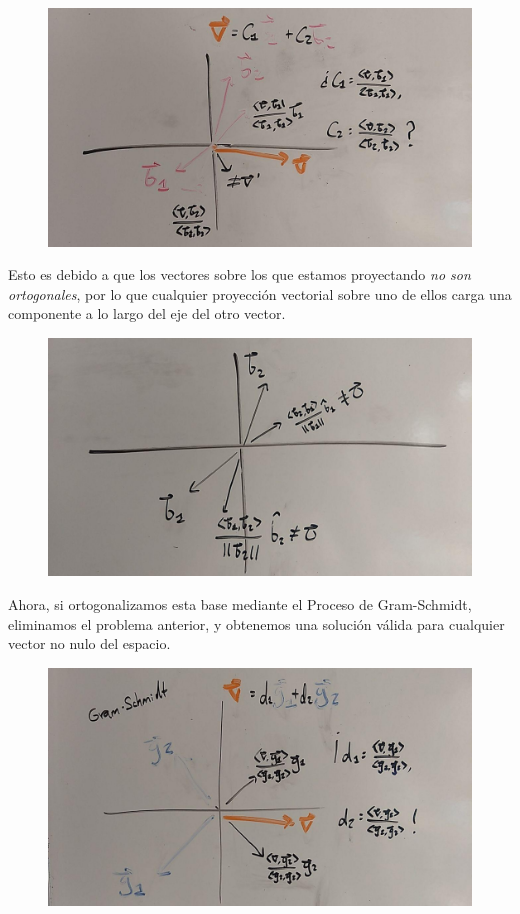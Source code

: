 \documentclass[12pt,dvipsnames]{article}
\numberwithin{equation}{section}
\begin{document}
\begin{figure}[h!]
    \centering
    \includegraphics[width=16cm]{3/Bases_ortogonales_y_ortonormales_3-2.jpg}
\end{figure}

Esto es debido a que los vectores sobre los que estamos proyectando \emph{no son ortogonales}, por lo que cualquier proyección vectorial sobre uno de ellos carga una componente a lo largo del eje del otro vector. 

\begin{figure}[h!]
    \centering
    \includegraphics[width=16cm]{3/Bases_ortogonales_y_ortonormales_3-3.jpg}
\end{figure}

\newpage
Ahora, si ortogonalizamos esta base mediante el Proceso de Gram-Schmidt, eliminamos el problema anterior, y obtenemos una solución válida para cualquier vector no nulo del espacio.

\begin{figure}[h!]
    \centering
    \includegraphics[width=16cm]{3/Bases_ortogonales_y_ortonormales_3-4.jpg}
\end{figure}
\end{document}
